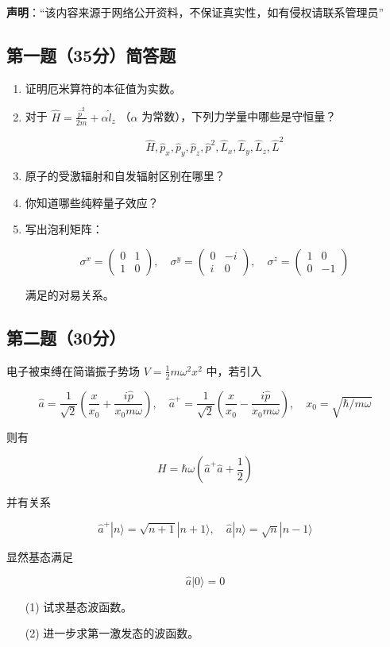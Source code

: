 
\textbf{声明}：“该内容来源于网络公开资料，不保证真实性，如有侵权请联系管理员”

\subsection{第一题（35分）简答题}
\begin{enumerate}
    \item  证明厄米算符的本征值为实数。
    
    \item  对于 $\hat{H} = \frac{\hat{p}^2}{2m} + \alpha \hat{l}_z$ （$\alpha$ 为常数），下列力学量中哪些是守恒量？
    
    \[
    \hat{H}, \hat{p}_x, \hat{p}_y, \hat{p}_z, \hat{p}^2, \hat{L}_x, \hat{L}_y, \hat{L}_z, \hat{L}^2~
    \]
    
    \item  原子的受激辐射和自发辐射区别在哪里？
    
    \item  你知道哪些纯粹量子效应？
    
    \item  写出泡利矩阵：
    
    \[
    \sigma^x = \begin{pmatrix}
    0 & 1 \\
    1 & 0
    \end{pmatrix}, \quad
    \sigma^y = \begin{pmatrix}
    0 & -i \\
    i & 0
    \end{pmatrix}, \quad
    \sigma^z = \begin{pmatrix}
    1 & 0 \\
    0 & -1
    \end{pmatrix}~
    \]
    
    满足的对易关系。
\end{enumerate}
\subsection{第二题（30分）}
电子被束缚在简谐振子势场 $V = \frac{1}{2} m \omega^2 x^2$ 中，若引入

\[
\hat{a} = \frac{1}{\sqrt{2}}\left( \frac{x}{x_0} + \frac{i \hat{p}}{x_0 m \omega} \right), \quad
\hat{a}^+ = \frac{1}{\sqrt{2}}\left( \frac{x}{x_0} - \frac{i \hat{p}}{x_0 m \omega} \right), \quad
x_0 = \sqrt{\hbar/m \omega}~
\]

则有

\[
H = \hbar \omega \left( \hat{a}^+ \hat{a} + \frac{1}{2} \right)~
\]

并有关系

\[
\hat{a}^+ |n\rangle = \sqrt{n+1} |n+1\rangle, \quad
\hat{a} |n\rangle = \sqrt{n} |n-1\rangle~
\]

显然基态满足

\[
\hat{a} |0\rangle = 0~
\]

\begin{enumerate}
    \item [(1)] 试求基态波函数。
    \item [(2)] 进一步求第一激发态的波函数。
\end{enumerate}